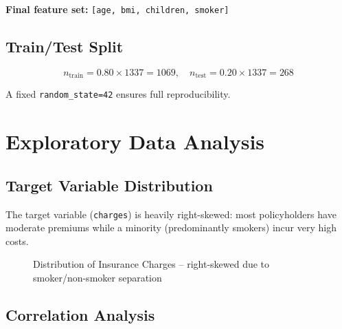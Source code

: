 \documentclass[12pt,a4paper]{report}
\begin{document}
\textbf{Final feature set:} \texttt{[age, bmi, children, smoker]}

\section{Train/Test Split}

\begin{equation}
  n_{\text{train}} = 0.80 \times 1337 = 1069, \quad n_{\text{test}} = 0.20 \times 1337 = 268
\end{equation}

A fixed \texttt{random\_state=42} ensures full reproducibility.

\chapter{Exploratory Data Analysis}

\section{Target Variable Distribution}

The target variable (\texttt{charges}) is heavily right-skewed: most policyholders have moderate premiums while a minority (predominantly smokers) incur very high costs.

\begin{figure}[H]
\centering
{}
\caption{Distribution of Insurance Charges -- right-skewed due to smoker/non-smoker separation}
\end{figure}

\section{Correlation Analysis}
\end{document}
